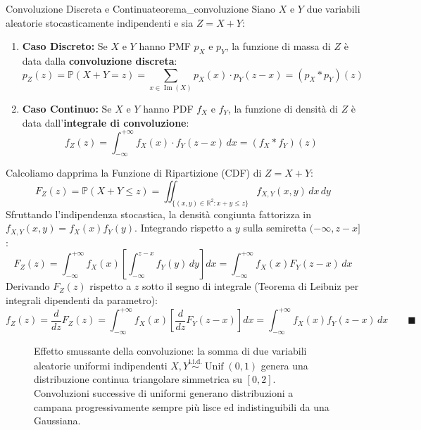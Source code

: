 \begin{teorema}{Convoluzione Discreta e Continua}{teorema_convoluzione}
Siano $X$ e $Y$ due variabili aleatorie stocasticamente indipendenti e sia $Z = X + Y$:
\begin{enumerate}
    \item \textbf{Caso Discreto:} Se $X$ e $Y$ hanno PMF $p_X$ e $p_Y$, la funzione di massa di $Z$ è data dalla \textbf{convoluzione discreta}:
    \begin{equation}
        p_Z(z) = \mathbb{P}(X + Y = z) = \sum_{x \in \operatorname{Im}(X)} p_X(x) \cdot p_Y(z - x) = (p_X * p_Y)(z)
    \end{equation}
    \item \textbf{Caso Continuo:} Se $X$ e $Y$ hanno PDF $f_X$ e $f_Y$, la funzione di densità di $Z$ è data dall'\textbf{integrale di convoluzione}:
    \begin{equation}
        f_Z(z) = \int_{-\infty}^{+\infty} f_X(x) \cdot f_Y(z - x) \, dx = (f_X * f_Y)(z)
    \end{equation}
\end{enumerate}
\end{teorema}

\begin{dimostrazione}
Calcoliamo dapprima la Funzione di Ripartizione (CDF) di $Z = X + Y$:
\begin{equation}
    F_Z(z) = \mathbb{P}(X + Y \le z) = \iint_{\{(x,y) \in \mathbb{R}^2 : x + y \le z\}} f_{X,Y}(x, y) \, dx \, dy
\end{equation}
Sfruttando l'indipendenza stocastica, la densità congiunta fattorizza in $f_{X,Y}(x, y) = f_X(x) f_Y(y)$. Integrando rispetto a $y$ sulla semiretta $(-\infty, z - x]$:
\begin{equation}
    F_Z(z) = \int_{-\infty}^{+\infty} f_X(x) \left[ \int_{-\infty}^{z - x} f_Y(y) \, dy \right] dx = \int_{-\infty}^{+\infty} f_X(x) F_Y(z - x) \, dx
\end{equation}
Derivando $F_Z(z)$ rispetto a $z$ sotto il segno di integrale (Teorema di Leibniz per integrali dipendenti da parametro):
\begin{equation}
    f_Z(z) = \frac{d}{dz} F_Z(z) = \int_{-\infty}^{+\infty} f_X(x) \left[ \frac{d}{dz} F_Y(z - x) \right] dx = \int_{-\infty}^{+\infty} f_X(x) f_Y(z - x) \, dx \qquad \blacksquare
\end{equation}
\end{dimostrazione}

\begin{figure}[htbp]
    \centering
    
    \caption{Effetto smussante della convoluzione: la somma di due variabili aleatorie uniformi indipendenti $X, Y \stackrel{\text{i.i.d.}}{\sim} \operatorname{Unif}(0,1)$ genera una distribuzione continua triangolare simmetrica su $[0, 2]$. Convoluzioni successive di uniformi generano distribuzioni a campana progressivamente sempre più lisce ed indistinguibili da una Gaussiana.}
    \label{fig:convoluzione_somma}
\end{figure}

